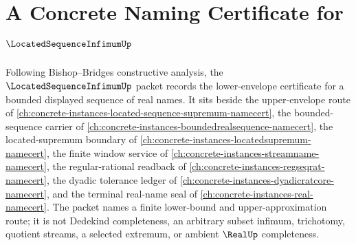 \chapter{A Concrete Naming Certificate for $\LocatedSequenceInfimumUp$}
\label{ch:concrete-instances-located-sequence-infimum-namecert}

Following Bishop--Bridges constructive analysis, the $\LocatedSequenceInfimumUp$ packet records the lower-envelope certificate for a bounded displayed sequence of real names. It sits beside the upper-envelope route of \autoref{ch:concrete-instances-located-sequence-supremum-namecert}, the bounded-sequence carrier of \autoref{ch:concrete-instances-boundedrealsequence-namecert}, the located-supremum boundary of \autoref{ch:concrete-instances-locatedsupremum-namecert}, the finite window service of \autoref{ch:concrete-instances-streamname-namecert}, the regular-rational readback of \autoref{ch:concrete-instances-regseqrat-namecert}, the dyadic tolerance ledger of \autoref{ch:concrete-instances-dyadicratcore-namecert}, and the terminal real-name seal of \autoref{ch:concrete-instances-real-namecert}. The packet names a finite lower-bound and upper-approximation route; it is not Dedekind completeness, an arbitrary subset infimum, trichotomy, quotient streams, a selected extremum, or ambient $\RealUp$ completeness.

